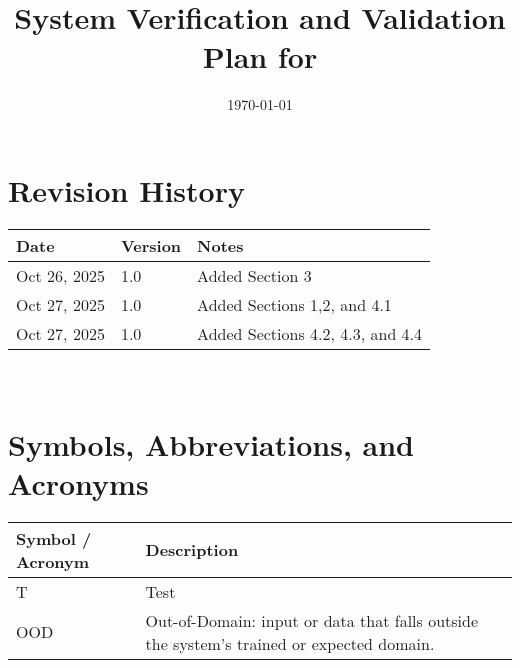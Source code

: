 \documentclass[12pt, titlepage]{article}
\begin{document}
\title{System Verification and Validation Plan for \progname{}} 
\author{\authname}
\date{\today}
	
\maketitle


\section*{Revision History}

\begin{tabularx}{\textwidth}{p{3cm}p{2cm}X}
\toprule {\bf Date} & {\bf Version} & {\bf Notes}\\
\midrule
Oct 26, 2025 & 1.0 & Added Section 3 \\
Oct 27, 2025 & 1.0 & Added Sections 1,2, and 4.1\\
Oct 27, 2025 & 1.0 & Added Sections 4.2, 4.3, and 4.4\\

\bottomrule
\end{tabularx}

~\\


\newpage

\tableofcontents

\listoftables

\listoffigures

\newpage

\section{Symbols, Abbreviations, and Acronyms}

\renewcommand{\arraystretch}{1.2}
\begin{tabular}{l l} 
  \toprule		
  \textbf{Symbol / Acronym} & \textbf{Description}\\
  \midrule 
  T & Test\\
  OOD & Out-of-Domain: input or data that falls outside the system's trained or expected domain.\\
  \bottomrule
\end{tabular}\\


\end{document}
